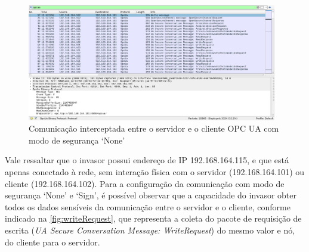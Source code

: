 \begin{figure}[htbp!]
    \caption{\label{fig:0-sniffing-wireshark}Comunicação interceptada entre o servidor e o cliente OPC UA com modo de segurança `None'}
    \begin{center}
        \includegraphics[width=0.972\textwidth]{USPSC-img/0-sniffing-wireshark-filtered-anon.png}
    \end{center}
\end{figure}

Vale ressaltar que o invasor possui endereço de IP 192.168.164.115, e que está apenas conectado à rede, sem interação física com o servidor (192.168.164.101) ou cliente (192.168.164.102). Para a configuração da comunicação com modo de segurança `None' e `Sign', é possível observar que a capacidade do invasor obter todos os dados sensíveis da comunicação entre o servidor e o cliente, conforme indicado na \autoref{fig:writeRequest}, que representa a coleta do pacote de requisição de escrita (\textit{UA Secure Conversation Message: WriteRequest}) do mesmo valor e nó, do cliente para o servidor.

